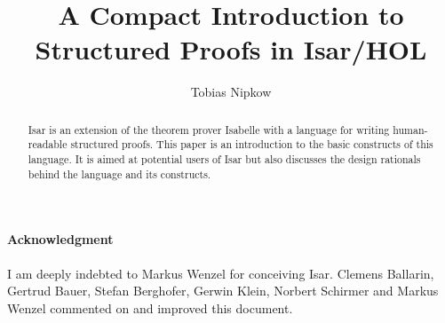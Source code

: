 \documentclass[envcountsame]{llncs}
\begin{document}
\title{A Compact Introduction to Structured Proofs in Isar/HOL}
\author{Tobias Nipkow}
\date{}
\maketitle

\begin{abstract}
  Isar is an extension of the theorem prover Isabelle with a language
  for writing human-readable structured proofs. This paper is an
  introduction to the basic constructs of this language. It is aimed
  at potential users of Isar but also discusses the design rationals
  behind the language and its constructs.
\end{abstract}





%


{\small
\paragraph{Acknowledgment}
I am deeply indebted to Markus Wenzel for conceiving Isar. Clemens Ballarin,
Gertrud Bauer, Stefan Berghofer, Gerwin Klein, Norbert Schirmer and
Markus Wenzel commented on and improved this document.
}

\begingroup
 \small\raggedright\frenchspacing

\endgroup
\end{document}
